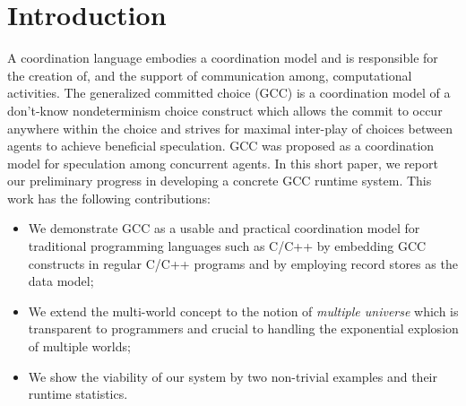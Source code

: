\documentclass[preprint,10pt]{sigplanconf}
\begin{document}
\section{Introduction}  %

A coordination language embodies a coordination model and is responsible for 
  the creation of, and the support of communication among, computational activities. 
The generalized committed choice (GCC) is a coordination model of 
a don't-know nondeterminism choice construct 
which allows the commit to occur anywhere within the choice \cite{JaffarYZ07} 
and strives for maximal inter-play of choices between agents
to achieve beneficial speculation. GCC was proposed as a coordination model 
for speculation among concurrent agents.
In this short paper, we report our preliminary progress in developing 
a concrete GCC runtime system. This work has the following contributions: 

\begin{itemize}
  \item We demonstrate GCC as a usable and practical coordination model for 
          traditional programming languages such as C/C++ by 
          embedding GCC constructs in regular C/C++ programs and by 
          employing record stores as the data model; 
  \item We extend the multi-world concept \cite{JaffarYZ07} 
          to the notion of \emph{multiple universe} 
          which is transparent to programmers and 
          crucial to handling the exponential explosion of multiple worlds; 
  \item We show the viability of our system by two non-trivial examples
          and their runtime statistics.
\end{itemize}
\end{document}
